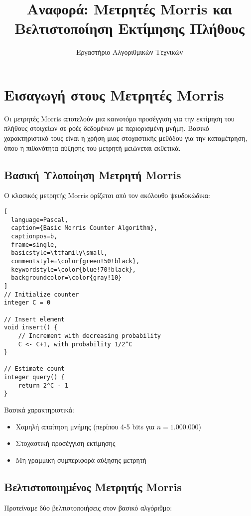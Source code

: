\documentclass[12pt,a4paper]{article}
\title{Αναφορά: Μετρητές Morris και Βελτιστοποίηση Εκτίμησης Πλήθους}
\author{Εργαστήριο Αλγοριθμικών Τεχνικών}
\date{}
\begin{document}
\maketitle


\section{Εισαγωγή στους Μετρητές Morris}


Οι μετρητές Morris αποτελούν μια καινοτόμο προσέγγιση για την εκτίμηση του πλήθους στοιχείων σε ροές δεδομένων με περιορισμένη μνήμη. Βασικό χαρακτηριστικό τους είναι η χρήση μιας στοχαστικής μεθόδου για την καταμέτρηση, όπου η πιθανότητα αύξησης του μετρητή μειώνεται εκθετικά.


\subsection{Βασική Υλοποίηση Μετρητή Morris}


Ο κλασικός μετρητής Morris ορίζεται από τον ακόλουθο ψευδοκώδικα:

\begin{lstlisting}[
  language=Pascal,
  caption={Basic Morris Counter Algorithm},
  captionpos=b,
  frame=single,
  basicstyle=\ttfamily\small,
  commentstyle=\color{green!50!black},
  keywordstyle=\color{blue!70!black},
  backgroundcolor=\color{gray!10}
]
// Initialize counter
integer C = 0

// Insert element
void insert() {
    // Increment with decreasing probability
    C <- C+1, with probability 1/2^C
}

// Estimate count
integer query() {
    return 2^C - 1
}
\end{lstlisting}


Βασικά χαρακτηριστικά:
\begin{itemize}
\item Χαμηλή απαίτηση μνήμης (περίπου 4-5 bits για $n = 1.000.000$)
\item Στοχαστική προσέγγιση εκτίμησης
\item Μη γραμμική συμπεριφορά αύξησης μετρητή
\end{itemize}


\subsection{Βελτιστοποιημένος Μετρητής Morris}


Προτείναμε δύο βελτιστοποιήσεις στον βασικό αλγόριθμο:
\end{document}
